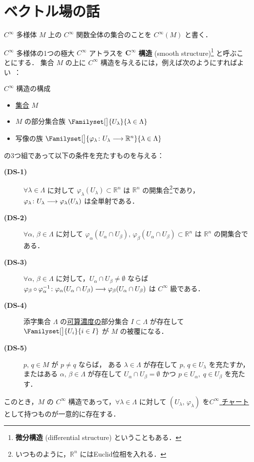 \documentclass[TQFT_main]{subfiles}
\begin{document}
\chapter{ベクトル場の話}

$C^\infty$ 多様体 $M$ 上の $C^\infty$ 関数全体の集合のことを $C^\infty (M)$ と書く．

$C^\infty$ 多様体の1つの極大 $C^\infty$ アトラスを $\bm{C^\infty}$ \textbf{構造} (smooth structure)\footnote{\textbf{微分構造} (differential structure) ということもある．} と呼ぶことにする．
集合 $M$ の上に $C^\infty$ 構造を与えるには，例えば次のようにすればよい~\cite[p.21, Lemma 1.35]{Lee2012smooth}：

\begin{mylem}[label=lem:cinfty-chart]{$C^\infty$ 構造の構成}
	\begin{itemize}
		\item \underline{集合} $M$
		\item $M$ の部分集合族 $\Familyset[\big]{U_\lambda}{\lambda \in \Lambda}$
		\item 写像の族 $\Familyset[\big]{\varphi_\lambda \colon U_\lambda \lto \mathbb{R}^n}{\lambda \in \Lambda}$
	\end{itemize}
	の3つ組であって以下の条件を充たすものを与える：
	\begin{description}
		\item[\textbf{(DS-1)}]  $\forall \lambda \in \Lambda$ に対して 
		$\varphi_\lambda (U_\lambda) \subset \mathbb{R}^n$ は $\mathbb{R}^n$ の開集合\footnote{いつものように，$\mathbb{R}^n$ にはEuclid位相を入れる．}であり，
		$\varphi_\lambda \colon U_\lambda \longrightarrow \varphi_\lambda (U_\lambda)$
		は全単射である．
		\item[\textbf{(DS-2)}]  $\forall \alpha,\, \beta \in \Lambda$ に対して $\varphi_\alpha (U_\alpha \cap U_\beta),\, \varphi_\beta (U_\alpha \cap U_\beta) \subset \mathbb{R}^n$ は $\mathbb{R}^n$ の開集合である．
		\item[\textbf{(DS-3)}]  $\forall \alpha,\, \beta \in \Lambda$ に対して，$U_\alpha \cap U_\beta \neq \emptyset$ ならば $\varphi_\beta \circ \varphi_\alpha^{-1} \colon \varphi_\alpha (U_\alpha \cap U_\beta) \longrightarrow \varphi_\beta (U_\alpha \cap U_\beta)$ は $C^\infty$ 級である．
		\item[\textbf{(DS-4)}]  添字集合 $\Lambda$ の\underline{可算濃度の}部分集合 $I \subset \Lambda$ が存在して
		$\Familyset[\big]{U_i}{i \in I}$ が $M$ の被覆になる．
		\item[\textbf{(DS-5)}]  $p,\, q \in M$ が $p \neq q$ ならば，
		ある $\lambda \in \Lambda$ が存在して $p,\, q \in U_\lambda$ を充たすか，
		またはある $\alpha,\, \beta \in \Lambda$ が存在して $U_\alpha \cap U_\beta = \emptyset$ かつ $p \in U_\alpha,\; q \in U_\beta$ を充たす．
	\end{description}
	このとき，$M$ の $C^\infty$ 構造であって，$\forall \lambda \in \Lambda$ に対して $(U_\lambda,\, \varphi_\lambda)$ を\hyperref[diffmani]{$C^\infty$ チャート}として持つものが一意的に存在する．
\end{mylem}
\end{document}
